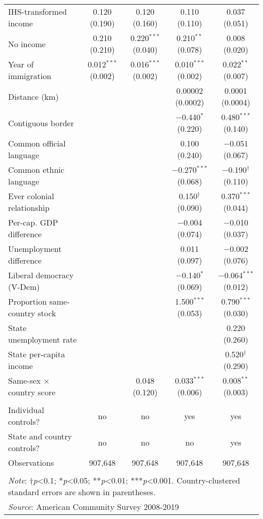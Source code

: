 \documentclass[
  11pt,
]{article}
\begin{document}
\begin{table}[H]
\begin{tabular}{@{\extracolsep{5pt}}lcccc}
  IHS-transformed income & 0.120 (0.190) & 0.120 (0.160) & 0.110 (0.110) & 0.037 (0.051) \\ 
  No income & 0.210 (0.210) & 0.220$^{***}$ (0.040) & 0.210$^{**}$ (0.078) & 0.008 (0.020) \\ 
  Year of immigration & 0.012$^{***}$ (0.002) & 0.016$^{***}$ (0.002) & 0.010$^{***}$ (0.002) & 0.022$^{**}$ (0.007) \\ 
  Distance (km) &  &  & 0.00002 (0.0002) & 0.0001 (0.0004) \\ 
  Contiguous border &  &  & $-$0.440$^{*}$ (0.220) & 0.480$^{***}$ (0.140) \\ 
  Common official language &  &  & 0.100 (0.240) & $-$0.051 (0.067) \\ 
  Common ethnic language &  &  & $-$0.270$^{***}$ (0.068) & $-$0.190$^{†}$ (0.110) \\ 
  Ever colonial relationship &  &  & 0.150$^{†}$ (0.090) & 0.370$^{***}$ (0.044) \\ 
  Per-cap. GDP difference &  &  & $-$0.004 (0.074) & $-$0.010 (0.037) \\ 
  Unemployment difference &  &  & 0.011 (0.097) & $-$0.002 (0.076) \\ 
  Liberal democracy (V-Dem) &  &  & $-$0.140$^{*}$ (0.069) & $-$0.064$^{***}$ (0.012) \\ 
  Proportion same-country stock &  &  & 1.500$^{***}$ (0.053) & 0.790$^{***}$ (0.030) \\ 
  State unemployment rate &  &  &  & 0.220 (0.260) \\ 
  State per-capita income &  &  &  & 0.520$^{†}$ (0.290) \\ 
  Same-sex × country score &  & 0.048 (0.120) & 0.033$^{***}$ (0.006) & 0.008$^{**}$ (0.003) \\ 
 \hline \\[-1.8ex] 
Individual controls? & no & no & yes & yes \\ 
State and country controls? & no & no & no & yes \\ 
Observations & 907,648 & 907,648 & 907,648 & 907,648 \\ 
\hline 
\hline \\[-1.8ex] 
\multicolumn{5}{l}{\parbox[t]{\textwidth}{\textit{Note}: †\textit{p}<0.1; *\textit{p}<0.05; **\textit{p}<0.01; ***\textit{p}<0.001. Country-clustered standard errors are shown in parentheses.}} \\ 
\multicolumn{5}{l}{\textit{Source}: American Community Survey 2008-2019} \\ 
\end{tabular} 
\end{table}
\end{document}
